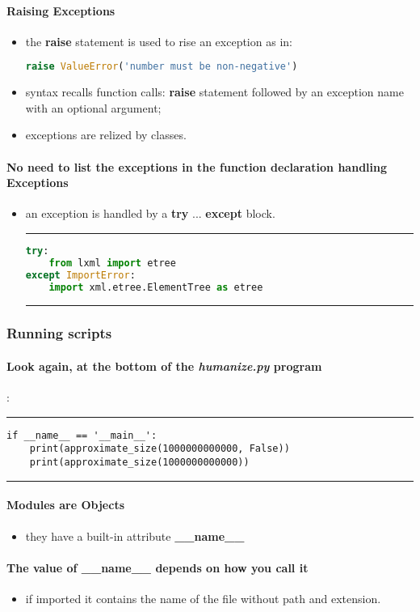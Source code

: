 \paragraph{Raising Exceptions}
\begin{itemize}
	\item the \textbf{raise} statement is used to rise an exception as in:
\begin{lstlisting}[language=Python]
raise ValueError('number must be non-negative')
\end{lstlisting}
	\item syntax recalls function calls: \textbf{raise} statement followed by an exception name with an optional argument;
	\item exceptions are relized by classes.
\end{itemize}
\paragraph{No need to list the exceptions in the function declaration handling Exceptions}
\begin{itemize}
	\item an exception is handled by a \textbf{try} ... \textbf{except} block.
\hrule
\begin{lstlisting}[language=Python]
try:
	from lxml import etree
except ImportError:
	import xml.etree.ElementTree as etree
\end{lstlisting}
\hrule
\end{itemize}
\subsubsection{Running scripts}
\paragraph{Look again, at the bottom of the \textit{humanize.py} program}:
\hrule
\begin{lstlisting}
if __name__ == '__main__':
	print(approximate_size(1000000000000, False))
	print(approximate_size(1000000000000))
\end{lstlisting}
\hrule
\paragraph{Modules are Objects}
\begin{itemize}
	\item they have a built-in attribute \textbf{\_\_name\_\_}
\end{itemize}
\paragraph{The value of \textbf{\_\_name\_\_} depends on how you call it}
\begin{itemize}
	\item if imported it contains the name of the file without path and extension.
\end{itemize}